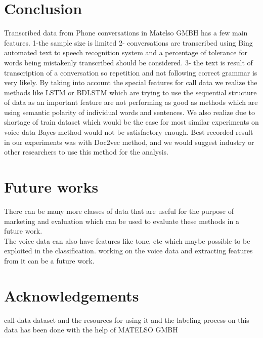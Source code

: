 \section{Conclusion}
	Transcribed data from Phone conversations in Matelso GMBH has a few main features. 1-the sample size is limited 2- conversations are transcribed using Bing automated text to speech recognition system and a percentage of tolerance for words being mistakenly transcribed should be considered. 3- the text is result of transcription of a conversation so repetition and not following correct grammar is very likely. By taking into account the special features for call data we realize the methods like LSTM or BDLSTM which are trying to use the sequential structure of data as an important feature are not performing as good as methods which are using semantic polarity of individual words and sentences. We also realize due to shortage of train dataset which would be the case for most similar experiments on voice data Bayes method would not be satisfactory enough. Best recorded result in our experiments was with Doc2vec method, and we would suggest industry or other researchers to use this method for the analysis.
	
\section{Future works}
	There can be many more classes of data that are useful for the purpose of marketing and evaluation which can be used to evaluate these methods in a future work.\\
	The voice data can also have features like tone, etc which maybe possible to be exploited in the classification. working on the voice data and extracting features from it can be a future work. 
\section{Acknowledgements}
	call-data dataset and the resources for using it and the labeling process on this data has been done with the help of MATELSO GMBH

%

%
%


